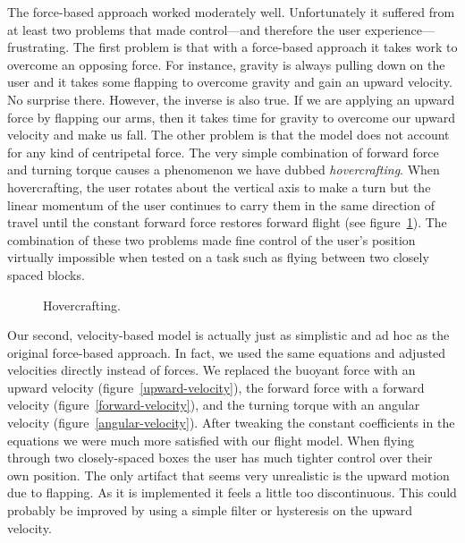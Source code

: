\documentclass{article}
\begin{document}
The force-based approach worked moderately well.  Unfortunately it suffered
from at least two problems that made control---and therefore the user experience---%
frustrating.  The first problem is that with a force-based approach it takes
work to overcome an opposing force.  For instance, gravity is always pulling
down on the user and it takes some flapping to overcome gravity and gain an
upward velocity.  No surprise there.  However, the inverse is also true.  If we
are applying an upward force by flapping our arms, then it takes time for
gravity to overcome our upward velocity and make us fall.  The other problem is
that the model does not account for any kind of centripetal force.  The very
simple combination of forward force and turning torque causes a phenomenon we
have dubbed \emph{hovercrafting}.  When hovercrafting, the user rotates about the
vertical axis to make a turn but the linear momentum of the user continues to
carry them in the same direction of travel until the constant forward force
restores forward flight (see figure~\ref{fig:hovercrafting}).  The combination
of these two problems made fine control of the user's position virtually
impossible when tested on a task such as flying between two closely spaced
blocks.

\begin{figure}[h!t]
\begin{center}
\end{center}
\caption{Hovercrafting.}
\label{fig:hovercrafting}
\end{figure}

Our second, velocity-based model is actually just as simplistic and ad hoc as
the original force-based approach.  In fact, we used the same equations and
adjusted velocities directly instead of forces.  We replaced the buoyant force
with an upward velocity (figure~\ref{upward-velocity}), the forward force with
a forward velocity (figure~\ref{forward-velocity}), and the turning torque with
an angular velocity (figure~\ref{angular-velocity}).  After tweaking the
constant coefficients in the equations we were much more satisfied with our
flight model.  When flying through two closely-spaced boxes the user has much
tighter control over their own position.  The only artifact that seems very
unrealistic is the upward motion due to flapping.  As it is implemented it
feels a little too discontinuous.  This could probably be improved by using a
simple filter or hysteresis on the upward velocity.
\end{document}
